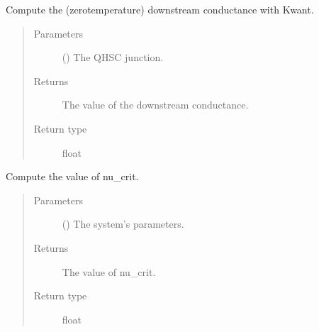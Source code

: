 \documentclass[letterpaper,10pt,english]{sphinxmanual}
\begin{document}
\begin{fulllineitems}
\label{\detokenize{modules:modules.utils.compute_downstream_conductance_TB}}
\pysigstartsignatures
{}
\pysigstopsignatures
\sphinxAtStartPar
Compute the (zero\sphinxhyphen{}temperature) downstream conductance with Kwant.
\begin{quote}\begin{description}
\item[{Parameters}] \leavevmode
\sphinxAtStartPar
{} () \textendash{} The QH\sphinxhyphen{}SC junction.

\item[{Returns}] \leavevmode
\sphinxAtStartPar
The value of the downstream conductance.

\item[{Return type}] \leavevmode
\sphinxAtStartPar
float

\end{description}\end{quote}

\end{fulllineitems}


\begin{fulllineitems}
\label{\detokenize{modules:modules.utils.compute_micro_nu_crit}}
\pysigstartsignatures
{}
\pysigstopsignatures
\sphinxAtStartPar
Compute the value of nu\_crit.
\begin{quote}\begin{description}
\item[{Parameters}] \leavevmode
\sphinxAtStartPar
{} () \textendash{} The system’s parameters.

\item[{Returns}] \leavevmode
\sphinxAtStartPar
The value of nu\_crit.

\item[{Return type}] \leavevmode
\sphinxAtStartPar
float

\end{description}\end{quote}

\end{fulllineitems}
\end{document}
